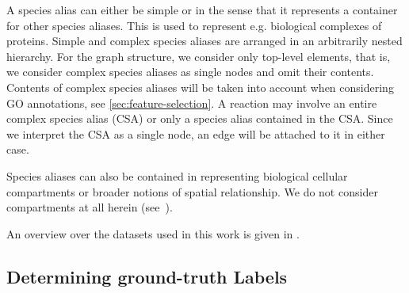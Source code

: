 \documentclass[
	fontsize=10pt, %
	twoside=false, %
	secnumdepth=1, %
  toc=indentunnumbered %
]{kaobook}
\begin{document}


A species alias can either be simple or  in the sense that it
represents a container for other species aliases. This is used to represent e.g.
biological complexes of proteins. Simple and complex species aliases are
arranged in an arbitrarily nested hierarchy. For the graph structure, we
consider only top-level elements, that is, we consider complex species aliases
as single nodes and omit their contents.  Contents of complex species
aliases will be taken into account when considering GO annotations, see
\ref{sec:feature-selection}.
A reaction may involve an entire complex species alias (CSA) or only a
species alias contained in the CSA. Since we interpret the CSA as a single node,
an edge will be attached to it in either case.

Species aliases can also be contained in  representing
biological cellular compartments or broader notions of spatial relationship. We
do not consider compartments at all herein (see~).

An overview over the datasets used in this work is given in .





\subsection{Determining ground-truth Labels}
\label{sec:determining-labels}
\end{document}
